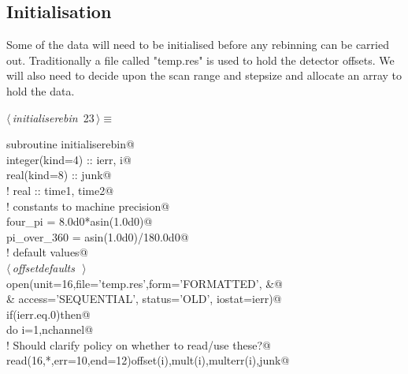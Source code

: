 \documentclass[10pt,a4paper,notitlepage]{article}
\begin{document}
\begin{flushleft}
\begin{minipage}{\linewidth}
\begin{list}{}{\setlength{\itemsep}{-\parsep}\setlength{\itemindent}{-\leftmargin}}
\item{}
\end{list}
\end{minipage}\vspace{4ex}
\end{flushleft}
\subsection{Initialisation}
\label{rebin:init}
Some of the data will need to be initialised before any rebinning can be
carried out. Traditionally a file called "temp.res" is used to hold the 
detector offsets. We will also need to decide upon the scan range and 
stepsize and allocate an array to hold the data.

\begin{flushleft} \small
\begin{minipage}{\linewidth}\label{scrap28}\raggedright\small
{} $\langle\,${\it initialiserebin}\nobreak\ {\footnotesize {23}}$\,\rangle\equiv$
\vspace{-1ex}
\begin{list}{}{} \item
\mbox{}\verb@      subroutine initialiserebin@\\
\mbox{}\verb@      integer(kind=4) :: ierr, i@\\
\mbox{}\verb@      real(kind=8) :: junk@\\
\mbox{}\verb@!      real :: time1, time2@\\
\mbox{}\verb@! constants to machine precision@\\
\mbox{}\verb@      four_pi = 8.0d0*asin(1.0d0)@\\
\mbox{}\verb@      pi_over_360 = asin(1.0d0)/180.0d0@\\
\mbox{}\verb@! default values@\\
\mbox{}\verb@@\hbox{$\langle\,${\it offsetdefaults}\nobreak\ {\footnotesize {}}$\,\rangle$}\verb@@\\
\mbox{}\verb@      open(unit=16,file='temp.res',form='FORMATTED',                    &@\\
\mbox{}\verb@     & access='SEQUENTIAL', status='OLD', iostat=ierr)@\\
\mbox{}\verb@      if(ierr.eq.0)then@\\
\mbox{}\verb@         do i=1,nchannel@\\
\mbox{}\verb@! Should clarify policy on whether to read/use these?@\\
\mbox{}\verb@          read(16,*,err=10,end=12)offset(i),mult(i),multerr(i),junk@\\

\end{list}
\end{minipage}
\end{flushleft}
\end{document}
